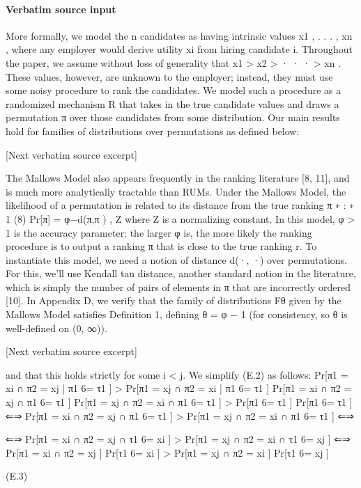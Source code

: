 \documentclass[10pt]{article}
\begin{document}
\paragraph{Verbatim source input}
\begin{ReviewVerbatim}
More formally, we model the n candidates as having intrinsic values x1 , . . . , xn , where any employer would
derive utility xi from hiring candidate i. Throughout the paper, we assume without loss of generality that
x1 > x2 > · · · > xn . These values, however, are unknown to the employer; instead, they must use some
noisy procedure to rank the candidates. We model such a procedure as a randomized mechanism R that
takes in the true candidate values and draws a permutation π over those candidates from some distribution.
Our main results hold for families of distributions over permutations as defined below:

[Next verbatim source excerpt]

The Mallows Model also appears frequently in the ranking literature [8, 11], and is much more analytically
tractable than RUMs. Under the Mallows Model, the likelihood of a permutation is related to its distance
from the true ranking π ∗ :
∗
1
(8)
Pr[π] = φ−d(π,π ) ,
Z
where Z is a normalizing constant. In this model, φ > 1 is the accuracy parameter: the larger φ is, the
more likely the ranking procedure is to output a ranking π that is close to the true ranking r. To instantiate
this model, we need a notion of distance d(·, ·) over permutations. For this, we’ll use Kendall tau distance,
another standard notion in the literature, which is simply the number of pairs of elements in π that are
incorrectly ordered [10]. In Appendix D, we verify that the family of distributions Fθ given by the Mallows
Model satisfies Definition 1, defining θ = φ − 1 (for consistency, so θ is well-defined on (0, ∞)).

[Next verbatim source excerpt]

and that this holds strictly for some i < j. We simplify (E.2) as follows:
Pr[π1 = xi ∩ π2 = xj | π1 6= τ1 ] > Pr[π1 = xj ∩ π2 = xi | π1 6= τ1 ]
Pr[π1 = xi ∩ π2 = xj ∩ π1 6= τ1 ]
Pr[π1 = xj ∩ π2 = xi ∩ π1 6= τ1 ]
>
Pr[π1 6= τ1 ]
Pr[π1 6= τ1 ]
⇐⇒ Pr[π1 = xi ∩ π2 = xj ∩ π1 6= τ1 ] > Pr[π1 = xj ∩ π2 = xi ∩ π1 6= τ1 ]
⇐⇒

⇐⇒ Pr[π1 = xi ∩ π2 = xj ∩ τ1 6= xi ] > Pr[π1 = xj ∩ π2 = xi ∩ τ1 6= xj ]
⇐⇒ Pr[π1 = xi ∩ π2 = xj ] Pr[τ1 6= xi ] > Pr[π1 = xj ∩ π2 = xi ] Pr[τ1 6= xj ]

(E.3)


\end{ReviewVerbatim}
\end{document}
